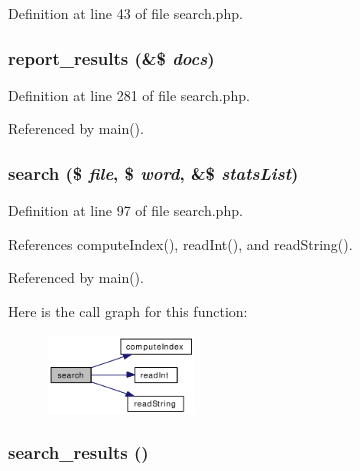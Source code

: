 Definition at line 43 of file search.php.\hypertarget{search_8php_4dc0f1a0569e69ffa8ed5b292d72f0e9}{
\subsubsection[report\_\-results]{\setlength{\rightskip}{0pt plus 5cm}report\_\-results (\&\$ {\em docs})}}
\label{search_8php_4dc0f1a0569e69ffa8ed5b292d72f0e9}




Definition at line 281 of file search.php.

Referenced by main().\hypertarget{search_8php_f66786bda8b625ad1ea9c3e8adf0862f}{
\subsubsection[search]{\setlength{\rightskip}{0pt plus 5cm}search (\$ {\em file}, \$ {\em word}, \&\$ {\em stats\-List})}}
\label{search_8php_f66786bda8b625ad1ea9c3e8adf0862f}




Definition at line 97 of file search.php.

References compute\-Index(), read\-Int(), and read\-String().

Referenced by main().

Here is the call graph for this function:\begin{figure}[H]
\begin{center}
\leavevmode
\includegraphics[width=110pt]{search_8php_f66786bda8b625ad1ea9c3e8adf0862f_cgraph}
\end{center}
\end{figure}
\hypertarget{search_8php_1e95c795bf9ffddb2afc947cd537d8e5}{
\subsubsection[search\_\-results]{\setlength{\rightskip}{0pt plus 5cm}search\_\-results ()}}
\label{search_8php_1e95c795bf9ffddb2afc947cd537d8e5}




